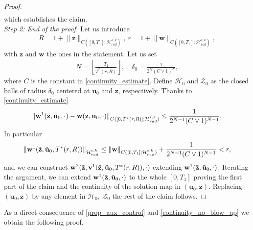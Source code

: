 \documentclass[12pt,reqno]{amsart}
\theoremstyle{plain}
\theoremstyle{remark}
\theoremstyle{plain}
\theoremstyle{definition}
\numberwithin{equation}{section}
\numberwithin{equation}{section}
\newcommand{\HH}{\mathcal{H}}
\begin{document}
\begin{proof}
\begin{multline}
		\end{multline}
		which establishes the claim.\\
		\emph{Step 2: End of the proof.} 
		Let us introduce \begin{align*}
			R=1+\lVert \mathbf{z}\rVert_{C([0,T_1];\HH_{rad}^{s,k})},\ r=1+\lVert \mathbf{w}\rVert_{C([0,T_1];\HH_{rad}^{s,k})},
		\end{align*}
        with 
		$\mathbf{z}$ and $\mathbf{w}$ the ones in the statement. Let us set \begin{align*}
		    N=\left\lfloor \frac{T_1}{T^{*}(r,R)}\right\rfloor,\quad \delta_0=\frac{1}{2^{N}(C\vee 1)^N },
		\end{align*} where $C$ is the constant in \eqref{continuity_estimate}. Define $\HH_0$ and $\mathcal{Z}_0$ as the closed balls of radius $\delta_0$ centered at $\mathbf{u}_0$  and $\mathbf{z}$, respectively. Thanks to \eqref{continuity_estimate}
		\begin{align*}
			\lVert \mathbf{w}^{1}(\Tilde{\mathbf{z}},\Tilde{\mathbf{u}}_{0},\cdot)-\mathbf{w}(\mathbf{z},\mathbf{u}_{0},\cdot)  \rVert_{C([0,T^{*}(r,R)];\HH_{rad}^{s,k})} \leq \frac{1}{2^{N-1}(C\vee 1)^{N-1}}.
		\end{align*}
		In particular 
		\begin{align*}
			\lVert \mathbf{w}^{1}(\Tilde{\mathbf{z}},\Tilde{\mathbf{u}}_{0},T^{*}(r,R))\rVert_{\HH_{rad}^{s,k}}\leq \lVert\mathbf{w}\rVert_{C([0,T_1];\HH_{rad}^{s,k})}+\frac{1}{2^{N-1}(C\vee 1)^{N-1}} <r,   
		\end{align*}
		and we can construct $\mathbf{w}^{2}(\Tilde{\mathbf{z}},\mathbf{v}^{1}(\Tilde{\mathbf{z}},\Tilde{\mathbf{u}}_{0},T^{*}(r,R)),\cdot)$ extending $\mathbf{w}^{1}(\Tilde{\mathbf{z}},\Tilde{\mathbf{u}}_{0},\cdot)$. Iterating the argument, we can extend $\mathbf{w}^{1}(\Tilde{\mathbf{z}},\Tilde{\mathbf{u}}_{0},\cdot)$ to the whole $[0,T_1]$ proving the first part of the claim and the continuity of the solution map in $(\mathbf{u}_0,\mathbf{z}).$ Replacing $(\mathbf{u}_0,\mathbf{z})$ by any element in $\mathcal{H}_0,\ \mathcal{Z}_0$ the rest of the claim follows.
	\end{proof}
	As a direct consequence of \autoref{prop_aux_control} and \autoref{continuity_no_blow_up} we obtain the following proof.
\end{document}
